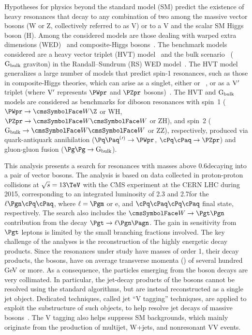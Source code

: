 Hypotheses for physics beyond the standard model (SM) predict the existence of heavy resonances that decay to any combination of two among 
the massive vector bosons (W or Z, collectively referred to as V) or to a V and the scalar SM Higgs boson (H). Among the considered models 
are those dealing with warped extra dimensions (WED)~\cite{Randall:1999ee,Randall:1999vf} and 
composite-Higgs bosons~\cite{Bellazzini:2014yua,CHM2,Composite2,Greco:2014aza}. 
The benchmark models considered are a heavy vector triplet (HVT) model~\cite{Pappadopulo:2014qza} and the bulk 
scenario~\cite{Agashe:2007zd, Fitzpatrick:2007qr, Antipin:2007pi} ($\mathrm{G}_\text{bulk}$ graviton) in the Randall--Sundrum (RS) WED 
model~\cite{Randall:1999ee,Randall:1999vf}.
The HVT model generalizes a large number of models that predict spin-1 resonances, such as those in composite-Higgs theories, which can 
arise as a singlet, either \PWpr or \PZpr~\cite{Grojean:2011vu,Langacker:2008yv,Salvioni:2009mt}, or as a $\mathrm{V}'$ triplet 
(where $\mathrm{V}'$ represents $\PWpr$ and $\PZpr$ bosons)~\cite{Pappadopulo:2014qza}.
The HVT and $\mathrm{G}_\text{bulk}$ models are considered as benchmarks for diboson resonances with spin~1 
($\PWpr\to\PW\Z$ or WH, $\PZpr\to\PW\PW$ or ZH), and spin~2 ($\Gbulk\to\PW\PW$ or ZZ), respectively, produced via quark-antiquark 
annihilation ($\qqbarpr\to\PWpr$, $\qqbar\to\PZpr$) and gluon-gluon fusion ($\Pg\Pg\to \Gbulk$).

This analysis presents a search for resonances with masses above 0.6\TeV decaying into a pair of vector bosons.
The analysis is based on data collected in proton-proton collisions at $\sqrt{s} = 13\TeV$ with the CMS experiment at the CERN LHC during 
2015, corresponding to an integrated luminosity of 2.3 and 2.7\fbinv for the $\ell\Pgn\qqbar$, where $\ell=\Pgm$ or e, and $\qqbar\qqbar$ 
final state, respectively. The \lnujet{} search also includes the $\PW\to\Pgt\Pgn$ contribution from the decay $\Pgt\to\ell\Pgn\Pagn$. 
The gain in sensitivity from $\Pgt$ leptons is limited by the small branching fractions involved. The key challenge of the analyses is the 
reconstruction of the highly energetic decay products. Since the resonances under study have masses of order 1\TeV, their decay products, 
\ie{} the bosons, have on average transverse momenta (\pt) of several hundred GeV or more. As a consequence, the particles emerging from 
the boson decays are very collimated. In particular, the jet-decay products of the bosons cannot be resolved using the standard algorithms, 
but are instead reconstructed as a single jet object. Dedicated techniques, called jet ``V tagging'' techniques, are applied to exploit the 
substructure of such objects, to help resolve jet decays of massive bosons~\cite{CMS-PAS-JME-14-002,Khachatryan:2014vla}. The V tagging 
also helps suppress SM backgrounds, which mainly originate from the production of multijet, W+jets, and nonresonant VV events.

